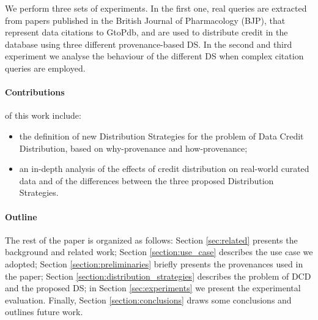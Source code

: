 We perform three sets of experiments. In the first one, real queries are extracted from papers published in the British Journal of Pharmacology (BJP), that represent data citations to GtoPdb, and are used to distribute credit in the database using three different provenance-based DS. 
In the second and third experiment we analyse the behaviour of the different DS when  complex citation queries are employed.


\paragraph{\textbf{Contributions}} of this work include:
\begin{itemize}
    \item the definition of new Distribution Strategies for the problem of Data Credit Distribution, based on why-provenance and how-provenance;
    \item an in-depth analysis of the effects of credit distribution on real-world curated data and of the differences between the three proposed Distribution Strategies.
\end{itemize}

\paragraph{\textbf{Outline}} The rest of the paper is organized as follows:
Section \ref{sec:related} presents the background and related work; Section \ref{section:use_case} describes the use case we adopted; Section \ref{section:preliminaries} briefly presents the provenances used in the paper; Section \ref{section:distribution_strategies} describes the problem of DCD and the proposed DS; in Section \ref{sec:experiments} we present the experimental evaluation. Finally, Section \ref{section:conclusions} draws some conclusions and outlines future work.



 
